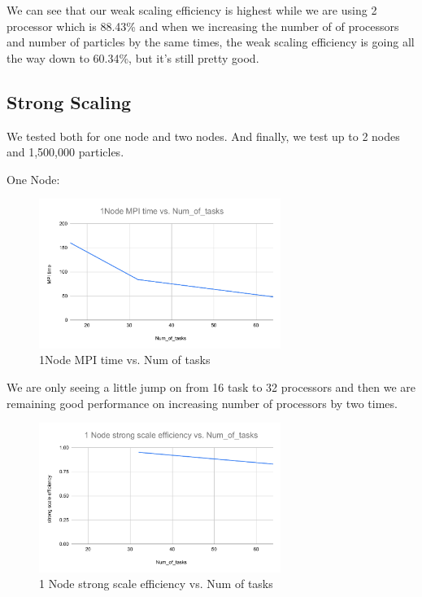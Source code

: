 \documentclass{article}
\begin{document}
We can see that our weak scaling efficiency is highest while we are using 2 processor which is 88.43\% and when we increasing the number of of processors and number of particles by the same times, the weak scaling efficiency is going all the way down to 60.34\%, but it's still pretty good.

\subsection{Strong Scaling}
We tested both for one node and two nodes. And finally, we test up to 2 nodes and 1,500,000 particles.

One Node:
\begin{figure}[H] %
\centering %
\includegraphics[width=0.7\textwidth]{1Node MPI time vs. Num_of_tasks.pdf} %
\caption{1Node MPI time vs. Num of tasks} %
\label{1Node MPI time vs. Num_of_tasks} %
\end{figure}
We are only seeing a little jump on from 16 task to 32 processors and then we are remaining good performance on increasing number of processors by two times.

\begin{figure}[H] %
\centering %
\includegraphics[width=0.7\textwidth]{1 Node strong scale efficiency vs. Num_of_tasks.pdf} %
\caption{1 Node strong scale efficiency vs. Num of tasks} %
\label{1 Node strong scale efficiency vs. Num_of_tasks} %
\end{figure}
\end{document}
